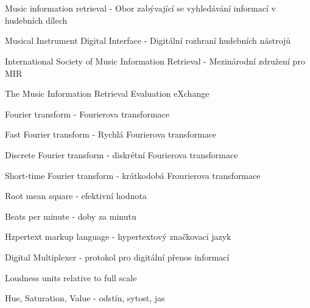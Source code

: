 \cleardoublepage
\chapter*{\listofabbrevname}
{}

\begin{acronym}[KolikMista]
		{Music information retrieval - Obor zabývající se vyhledávání informací v hudebních dílech}
	
		{Musical Instrument Digital Interface - Digitální rozhraní hudebních nástrojů}

		{International Society of Music Information Retrieval - Mezinárodní združení pro \acs*{MIR}}	

		{The Music Information Retrieval Evaluation eXchange}

		{Fourier transform - Fourierova transformace}
		
		{Fast Fourier transform - Rychlá Fourierova transformace}

		{Discrete Fourier transform - diskrétní Fourierova transformace}

		{Short-time Fourier transform - krátkodobá Frourierova transformace}
	
		{Root mean square - efektivní hodnota}

		{Beats per minute - doby za minutu}

		{Hzpertext markup language -  hypertextový značkovací jazyk}

		{Digital Multiplexer - protokol pro digitální přenos informací}
	
		{Loudness units relative to full scale}
	
		{Hue, Saturation, Value - odstín, sytost, jas}
\end{acronym}
